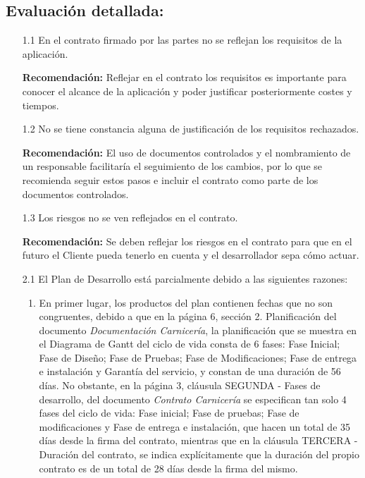 \documentclass[a4paper,12pt]{report}
\begin{document}
\newpage
\subsection*{Evaluación detallada:}

\begin{enumerate}
    \item[1.1] En el contrato firmado por las partes no se reflejan los requisitos de la aplicación.\\
    \vspace{0.05cm}
    
    \textbf{Recomendación:} Reflejar en el contrato los requisitos es importante para conocer el alcance de la aplicación y poder justificar posteriormente costes y tiempos.\\

    \item[1.2] No se tiene constancia alguna de justificación de los requisitos rechazados.\\ 
    \vspace{0.05cm}
    
    \textbf{Recomendación:} El uso de documentos controlados y el nombramiento de un responsable facilitaría el seguimiento de los cambios, por lo que se recomienda seguir estos pasos e incluir el contrato como parte de los documentos controlados. \\ 
    \item[1.3] Los riesgos no se ven reflejados en el contrato.\\
    \vspace{0.05cm}
    
    \textbf{Recomendación:} Se deben reflejar los riesgos en el contrato para que en el futuro el Cliente pueda tenerlo en cuenta y el desarrollador sepa cómo actuar.\\
    \item[2.1] El Plan de Desarrollo está parcialmente debido a las siguientes razones:
        \begin{enumerate}
        
            \item En primer lugar, los productos del plan contienen fechas que no
            son congruentes, debido a que en la página 6, sección 2. Planificación del
            documento \textit{Documentación Carnicería}, la planificación que se muestra
            en el Diagrama de Gantt del ciclo de vida consta de 6 fases: Fase Inicial; 
            Fase de Diseño; Fase de Pruebas; Fase de Modificaciones; Fase de entrega
            e instalación y Garantía del servicio, y constan de una duración de 56
            días. No obstante, en la página 3, cláusula SEGUNDA - Fases de desarrollo,
            del documento \textit{Contrato Carnicería} se especifican tan solo 4 fases
            del ciclo de vida: Fase inicial; Fase de pruebas; Fase de modificaciones y
            Fase de entrega e instalación, que hacen un total de 35 días desde la firma
            del contrato, mientras que en la cláusula TERCERA - Duración del contrato,
            se indica explícitamente que la duración del propio contrato es de un total
            de 28 días desde la firma del mismo.\label{productos}
            

\end{enumerate}
\end{enumerate}
\end{document}
